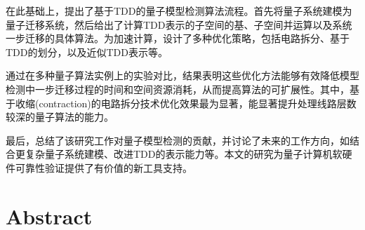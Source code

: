 在此基础上，提出了基于TDD的量子模型检测算法流程。首先将量子系统建模为量子迁移系统，然后给出了计算TDD表示的子空间的基、子空间并运算以及系统一步迁移的具体算法。为加速计算，设计了多种优化策略，包括电路拆分、基于TDD的划分，以及近似TDD表示等。

通过在多种量子算法实例上的实验对比，结果表明这些优化方法能够有效降低模型检测中一步迁移过程的时间和空间资源消耗，从而提高算法的可扩展性。其中，基于收缩(contraction)的电路拆分技术优化效果最为显著，能显著提升处理线路层数较深的量子算法的能力。

最后，总结了该研究工作对量子模型检测的贡献，并讨论了未来的工作方向，如结合更复杂量子系统建模、改进TDD的表示能力等。本文的研究为量子计算机软硬件可靠性验证提供了有价值的新工具支持。

\intobmk\chapter*{Abstract}%




